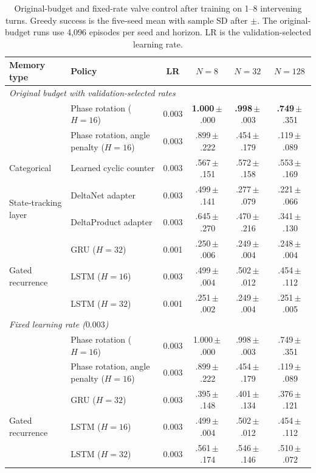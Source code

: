 \begin{table}[H]
\centering\small
\caption{Original-budget and fixed-rate valve control after training on 1--8
intervening turns. Greedy success is the five-seed mean with sample SD
after $\pm$. The original-budget runs use 4,096 episodes
per seed and horizon. LR is the validation-selected learning rate.}
\label{tab:valve-original}
\label{tab:valvefixed}
\setlength{\tabcolsep}{5pt}
\begin{tabular}{@{}llcccc@{}}
\toprule
Memory type & Policy & LR & $N=8$ & $N=32$ & $N=128$ \\
\midrule
\multicolumn{6}{l}{\emph{Original budget with validation-selected rates}} \\
\addlinespace
\multirow{2}{*}{Phase rotation} & Phase rotation ($H=16$) & 0.003 & \textbf{1.000}\,$\pm$\,.000 & \textbf{.998}\,$\pm$\,.003 & \textbf{.749}\,$\pm$\,.351 \\
 & Phase rotation, angle penalty ($H=16$) & 0.003 & .899\,$\pm$\,.222 & .454\,$\pm$\,.179 & .119\,$\pm$\,.089 \\
\midrule
Categorical & Learned cyclic counter & 0.003 & .567\,$\pm$\,.151 & .572\,$\pm$\,.158 & .553\,$\pm$\,.169 \\
\midrule
\multirow{2}{*}{State-tracking layer} & DeltaNet adapter & 0.003 & .499\,$\pm$\,.141 & .277\,$\pm$\,.079 & .221\,$\pm$\,.066 \\
 & DeltaProduct adapter & 0.003 & .645\,$\pm$\,.270 & .470\,$\pm$\,.216 & .341\,$\pm$\,.130 \\
\midrule
\multirow{3}{*}{Gated recurrence} & GRU ($H=32$) & 0.001 & .250\,$\pm$\,.006 & .249\,$\pm$\,.004 & .248\,$\pm$\,.004 \\
 & LSTM ($H=16$) & 0.003 & .499\,$\pm$\,.004 & .502\,$\pm$\,.012 & .454\,$\pm$\,.112 \\
 & LSTM ($H=32$) & 0.001 & .251\,$\pm$\,.002 & .249\,$\pm$\,.004 & .251\,$\pm$\,.005 \\
\midrule
\multicolumn{6}{l}{\emph{Fixed learning rate ($0.003$)}} \\
\addlinespace
\multirow{2}{*}{Phase rotation} & Phase rotation ($H=16$) & 0.003 & 1.000\,$\pm$\,.000 & .998\,$\pm$\,.003 & .749\,$\pm$\,.351 \\
 & Phase rotation, angle penalty ($H=16$) & 0.003 & .899\,$\pm$\,.222 & .454\,$\pm$\,.179 & .119\,$\pm$\,.089 \\
\midrule
\multirow{3}{*}{Gated recurrence} & GRU ($H=32$) & 0.003 & .395\,$\pm$\,.148 & .401\,$\pm$\,.134 & .376\,$\pm$\,.121 \\
 & LSTM ($H=16$) & 0.003 & .499\,$\pm$\,.004 & .502\,$\pm$\,.012 & .454\,$\pm$\,.112 \\
 & LSTM ($H=32$) & 0.003 & .561\,$\pm$\,.174 & .546\,$\pm$\,.146 & .510\,$\pm$\,.072 \\
\bottomrule
\end{tabular}
\end{table}
